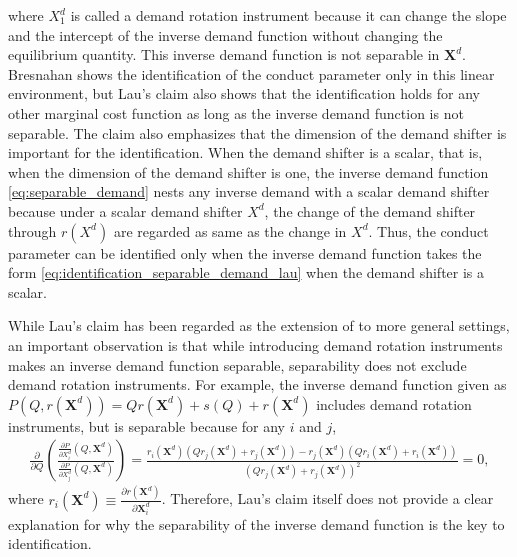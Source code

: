 \documentclass[11pt, a4paper]{article}
\begin{document}
where $X^{d}_1$ is called a demand rotation instrument because it can change the slope and the intercept of the inverse demand function without changing the equilibrium quantity.
This inverse demand function is not separable in $\bm{X}^{d}$.
Bresnahan shows the identification of the conduct parameter only in this linear environment, but Lau's claim also shows that the identification holds for any other marginal cost function as long as the inverse demand function is not separable.
The claim also emphasizes that the dimension of the demand shifter is important for the identification.
When the demand shifter is a scalar, that is, when the dimension of the demand shifter is one, the inverse demand function \eqref{eq:separable_demand} nests any inverse demand with a scalar demand shifter because under a scalar demand shifter $X^{d}$, the change of the demand shifter through $r(X^{d})$ are regarded as same as the change in $X^{d}$.
Thus, the conduct parameter can be identified only when the inverse demand function takes the form \eqref{eq:identification_separable_demand_lau} when the demand shifter is a scalar.

While Lau's claim has been regarded as the extension of \citet{bresnahanOligopoly1982} to more general settings, an important observation is that while introducing demand rotation instruments makes an inverse demand function separable, separability does not exclude demand rotation instruments.
For example, the inverse demand function given as $P(Q, r(\bm{X}^d)) = Qr(\bm{X}^d) + s(Q) + r(\bm{X}^d)$ includes demand rotation instruments, but is separable because for any $i$ and $j$,
\begin{align}
    \frac{\partial}{\partial Q}\left(\frac{\frac{\partial P}{\partial X^{d}_i}(Q,\bm{X}^d)}{\frac{\partial P}{\partial X^{d}_j}(Q,\bm{X}^d)}\right) = \frac{r_i(\bm{X}^d)(Qr_j(\bm{X}^d) + r_j(\bm{X}^d)) - r_j(\bm{X}^d)(Qr_i(\bm{X}^d) + r_i(\bm{X}^d))}{(Qr_j(\bm{X}^d) + r_j(\bm{X}^d))^2} = 0,
\end{align}
where $r_i(\bm{X}^d) \equiv \frac{\partial r(\bm{X}^{d})}{\partial \bm{X}^{d}_i}$.
Therefore, Lau's claim itself does not provide a clear explanation for why the separability of the inverse demand function is the key to identification.
\end{document}
